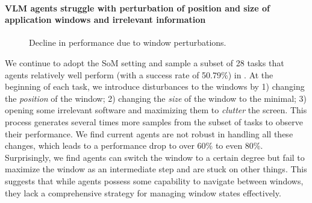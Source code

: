 \paragraph{VLM agents struggle with perturbation of position and size of application windows and irrelevant information}
\begin{figure}

    \vspace{-10pt}
    \caption{Decline in performance due to window perturbations.
    }
    \label{fig:ui_robustness}
    \vspace{-5pt}
\end{figure}

We continue to adopt the SoM setting and sample a subset of 28 tasks that agents relatively well perform (with a success rate of 50.79\%) in \ours.
At the beginning of each task, we introduce disturbances to the windows by 1) changing the 
\textit{position} of the window; 2) changing the \textit{size} of the window to the minimal; 
3) opening some irrelevant software and maximizing them to \textit{clutter} the screen.
This process generates several times more samples from the subset of tasks to observe their performance. 
We find current agents are not robust in handling all these changes, which leads to a performance drop to over 60\% to even 80\%.
Surprisingly, we find agents can switch the window to a certain degree but fail to maximize the window as an intermediate step and are stuck on other things. 
This suggests that while agents possess some capability to navigate between windows, they lack a comprehensive strategy for managing window states effectively.

